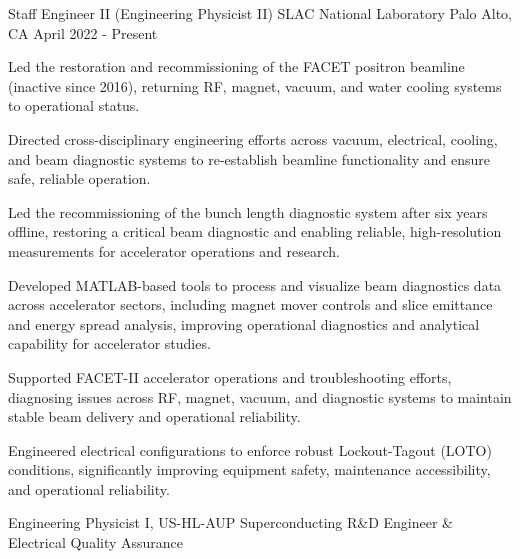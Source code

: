 \vspace{-3mm}


\begin{cventries}

\cventry
{Staff Engineer II (Engineering Physicist II)}
{SLAC National Laboratory}
{Palo Alto, CA}
{April 2022 - Present}
{
\begin{cvitems}
\item {Led the restoration and recommissioning of the FACET positron beamline (inactive since 2016), returning RF, magnet, vacuum, and water cooling systems to operational status.}
\item {Directed cross-disciplinary engineering efforts across vacuum, electrical, cooling, and beam diagnostic systems to re-establish beamline functionality and ensure safe, reliable operation.}
\item {Led the recommissioning of the bunch length diagnostic system after six years offline, restoring a critical beam diagnostic and enabling reliable, high-resolution measurements for accelerator operations and research.}
\item {Developed MATLAB-based tools to process and visualize beam diagnostics data across accelerator sectors, including magnet mover controls and slice emittance and energy spread analysis, improving operational diagnostics and analytical capability for accelerator studies.}
\item {Supported FACET-II accelerator operations and troubleshooting efforts, diagnosing issues across RF, magnet, vacuum, and diagnostic systems to maintain stable beam delivery and operational reliability.}
\item {Engineered electrical configurations to enforce robust Lockout-Tagout (LOTO) conditions, significantly improving equipment safety, maintenance accessibility, and operational reliability.}
\end{cvitems}
}
\vspace{6mm}
\cventry
{Engineering Physicist I, US-HL-AUP Superconducting R\&D Engineer \& Electrical Quality Assurance}

\end{cventries}
